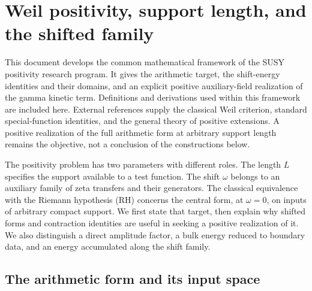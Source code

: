 
\section{Weil positivity, support length, and the shifted family}
\label{sec:rh-background}

This document develops the common mathematical framework of the
SUSY positivity research program. It gives the arithmetic target, the
shift-energy identities and their domains, and an explicit positive
auxiliary-field realization of the gamma kinetic term. Definitions and
derivations used within this framework are included here. External
references supply the classical Weil criterion, standard special-function
identities, and the general theory of positive extensions. A positive
realization of the full arithmetic form at arbitrary support length
remains the objective, not a conclusion of the constructions below.

The positivity problem has two parameters with different
roles. The length $L$ specifies the support available to a test function.
The shift $\omega$ belongs to an auxiliary family of zeta transfers and
their generators. The classical equivalence with the Riemann hypothesis
(RH) concerns the central form, at $\omega=0$, on inputs of arbitrary
compact support. We first state that target, then explain why shifted
forms and contraction identities are useful in seeking a positive
realization of it. We also distinguish a direct amplitude factor, a
bulk energy reduced to boundary data, and an energy accumulated along
the shift family.

\subsection{The arithmetic form and its input space}
\label{subsec:rh-form}

